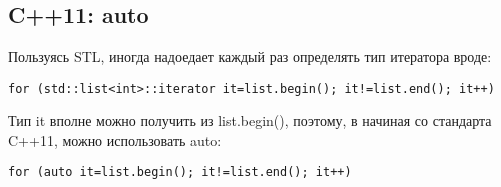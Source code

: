 ﻿\section{}

\subsection{C++11: auto}

Пользуясь \ac{STL}, иногда надоедает каждый раз определять тип итератора вроде:

\begin{lstlisting}
for (std::list<int>::iterator it=list.begin(); it!=list.end(); it++)
\end{lstlisting}

Тип it вполне можно получить из list.begin(), поэтому, в начиная со стандарта C++11, можно использовать auto:

\begin{lstlisting}
for (auto it=list.begin(); it!=list.end(); it++)
\end{lstlisting}

